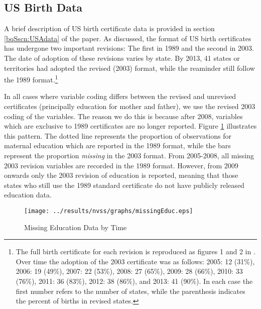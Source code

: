 \documentclass[a4paper, 12 pt]{article}
\theoremstyle{plain}
\begin{document}
\begin{doublespace}
\subsection{US Birth Data}
A brief description of US birth certificate data is provided in section
\ref{bqSscn:USAdata} of the paper.  As discussed, the format of US birth
certificates has undergone two important revisions: The first in 1989
and the second in 2003.  The date of adoption of these revisions varies
by state.  By 2013, 41 states or territories had adopted the revised (2003)
format, while the reaminder still follow the 1989 format.\footnote{The full
birth certificate for each revision is reproduced as figures 1 and 2 in
\citet{MenackerMartin2005}.  Over time the adoption of the 2003 certificate
was as follows: 2005: 12 (31\%), 2006: 19 (49\%), 2007: 22 (53\%), 2008: 27
(65\%), 2009: 28 (66\%), 2010: 33 (76\%), 2011: 36 (83\%), 2012: 38 (86\%),
and 2013: 41 (90\%).  In each case the first number refers to the number
of states, while the parenthesis indicates the percent of births in revised
states.}

In all cases where variable coding differs between the revised and unrevised
certificates (principally education for mother and father), we use the revised
2003 coding of the variables.  The reason we do this is because after 2008,
variables which are exclusive to 1989 certificates are no longer reported.
Figure \ref{bqFig:educMissing} illustrates this pattern.  The dotted line
represents the proportion of observations for maternal education which are
reported in the 1989 format, while the bars represent the proportion
\emph{missing} in the 2003 format.  From 2005-2008, all missing 2003 revision
variables are recorded in the 1989 format.  However, from 2009 onwards only
the 2003 revision of education is reported, meaning that those states who
still use the 1989 standard certificate do not have publicly released education
data.  %




\begin{figure}[htpb!]
\caption{Missing Education Data by Time}
\label{bqFig:educMissing}
\texttt{[image: ../results/nvss/graphs/missingEduc.eps]}
\end{figure}
%



\end{doublespace}
\end{document}

